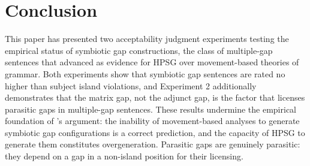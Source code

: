 \documentclass[12pt]{article}
\begin{document}

\section{Conclusion}\label{sec:conclusion}

This paper has presented two acceptability judgment experiments testing the empirical status of symbiotic gap constructions, the class of multiple-gap sentences that \citet{levine2003} advanced as evidence for HPSG over movement-based theories of grammar. Both experiments show that symbiotic gap sentences are rated no higher than subject island violations, and Experiment 2 additionally demonstrates that the matrix gap, not the adjunct gap, is the factor that licenses parasitic gaps in multiple-gap sentences. These results undermine the empirical foundation of \citeauthor{levine2003}'s argument: the inability of movement-based analyses to generate symbiotic gap configurations is a correct prediction, and the capacity of HPSG to generate them constitutes overgeneration. Parasitic gaps are genuinely parasitic: they depend on a gap in a non-island position for their licensing.

\printbibliography
\end{document}
